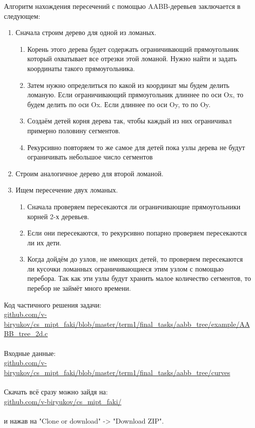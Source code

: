 \documentclass{article}
\begin{document}
Алгоритм нахождения пересечений с помощью AABB-деревьев заключается в следующем:
\begin{enumerate}
\item Сначала строим дерево для одной из ломаных. 
\begin{enumerate}
\item Корень этого дерева будет содержать ограничивающий прямоугольник который охватывает все отрезки этой ломаной. Нужно найти и задать координаты такого прямоугольника.
\item Затем нужно определиться по какой из координат мы будем делить ломаную. Если ограничивающий прямоугольник длиннее по оси Ox, то будем делить по оси Ox. Если длиннее по оси Oy, то по Oy.
\item Создаём детей корня дерева так, чтобы каждый из них ограничивал примерно половину сегментов.
\item Рекурсивно повторяем то же самое для детей пока узлы дерева не будут ограничивать небольшое число сегментов
\end{enumerate}
\item Строим аналогичное дерево для второй ломаной.
\item Ищем пересечение двух ломаных.
\begin{enumerate}
\item Сначала проверяем пересекаются ли ограничивающие прямоугольники корней 2-х деревьев. 
\item Если они пересекаются, то рекурсивно попарно проверяем пересекаются ли их дети.
\item Когда дойдём до узлов, не имеющих детей, то проверяем пересекаются ли кусочки ломанных ограничивающиеся этим узлом с помощью перебора. Так как эти узлы будут хранить малое количество сегментов, то перебор не займёт много времени.
\end{enumerate}
\end{enumerate}

Код частичного решения задачи: \\
\href{https://github.com/v-biryukov/cs_mipt_faki/blob/master/term1/final_tasks/aabb_tree/example/AABB_tree_2d.c}{github.com/v-biryukov/cs\_mipt\_faki/blob/master/term1/final\_tasks/aabb\_tree/example/AABB\_tree\_2d.c} \\
\\
Входные данные: \\
\href{https://github.com/v-biryukov/cs_mipt_faki/tree/master/term1/final_tasks/aabb_tree/curves}{github.com/v-biryukov/cs\_mipt\_faki/blob/master/term1/final\_tasks/aabb\_tree/curves} \\
\\
Скачать всё сразу можно зайдя на: \\
\href{https://github.com/v-biryukov/cs_mipt_faki/}{github.com/v-biryukov/cs\_mipt\_faki/} \\
\\
и нажав на "Clone or download" -> "Download ZIP".
\end{document}

